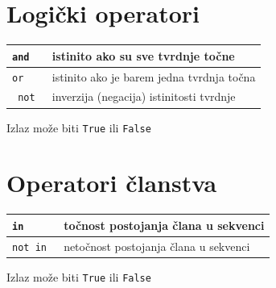 \documentclass[10pt]{article}
\begin{document}
    \section*{\color{NavyBlue} Logički operatori}
    \begin{tabular}{|>{\tt}p{9.00cm}|>{}p{15.50cm}|}
        \hline
        and   & istinito ako su sve tvrdnje točne           \\ \hline
        or    & istinito ako je barem jedna tvrdnja točna   \\ \hline
        not   & inverzija (negacija) istinitosti tvrdnje    \\ \hline
    \end{tabular}
    \begin{center}
        \footnotesize
        Izlaz može biti \texttt{True} ili \texttt{False}
    \end{center}

    \section*{\color{NavyBlue} Operatori članstva}
    \begin{tabular}{|>{\tt}p{9.00cm}|>{}p{15.50cm}|}
        \hline
        in        & točnost postojanja člana u sekvenci         \\ \hline
        not in    & netočnost postojanja člana u sekvenci       \\ \hline
    \end{tabular}
    \begin{center}
        \footnotesize
        Izlaz može biti \texttt{True} ili \texttt{False}
    \end{center}
\end{document}

